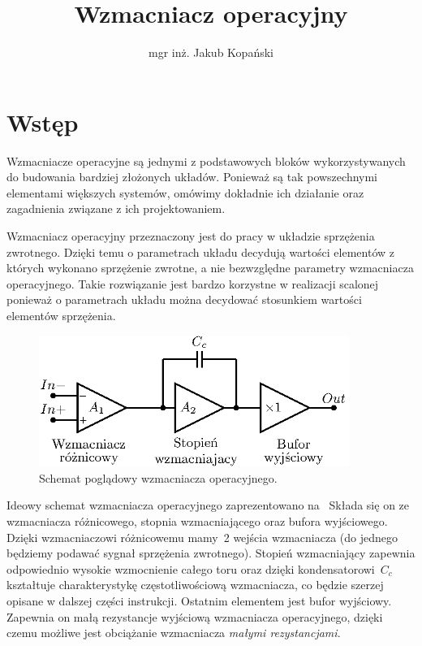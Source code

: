 \documentclass[twoside,pl,final]{labman}
\title{Wzmacniacz operacyjny}
\author{mgr inż. Jakub Kopański}
\begin{document}
\maketitle
\tableofcontents
\clearpage
\listoffigures
\clearpage

\chapter{Wstęp}
\label{intro}
Wzmacniacze operacyjne są jednymi z podstawowych bloków
wykorzystywanych do budowania bardziej złożonych układów.
Ponieważ są tak powszechnymi elementami większych systemów,
omówimy dokładnie ich działanie oraz
zagadnienia związane z ich projektowaniem.

Wzmacniacz operacyjny przeznaczony jest do
pracy w układzie sprzężenia zwrotnego.
Dzięki temu o parametrach układu decydują
wartości elementów z których wykonano sprzężenie zwrotne,
a nie bezwzględne parametry wzmacniacza operacyjnego.
Takie rozwiązanie jest bardzo korzystne w realizacji scalonej
ponieważ o parametrach układu można decydować
stosunkiem wartości elementów sprzężenia.

\begin{figure}[!htbp]
  \centering
  \includegraphics[width=0.9\textwidth]{idea}
  \caption{Schemat poglądowy wzmacniacza operacyjnego.}
  \label{fig:idea}
\end{figure}

Ideowy schemat wzmacniacza operacyjnego
zaprezentowano na~
Składa się on ze wzmacniacza różnicowego,
stopnia wzmacniającego oraz bufora wyjściowego.
Dzięki wzmacniaczowi różnicowemu mamy~2 wejścia wzmacniacza
(do jednego będziemy podawać sygnał sprzężenia zwrotnego).
Stopień wzmacniający zapewnia odpowiednio wysokie
wzmocnienie całego toru oraz dzięki kondensatorowi~$C_c$
kształtuje charakterystykę częstotliwościową wzmacniacza,
co będzie szerzej opisane w dalszej części instrukcji.
Ostatnim elementem jest bufor wyjściowy.
Zapewnia on małą rezystancje wyjściową wzmacniacza operacyjnego,
dzięki czemu możliwe jest obciążanie wzmacniacza \emph{małymi rezystancjami}.
\end{document}
